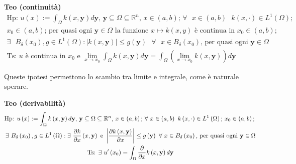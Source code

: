 \documentclass{article}
\begin{document}
\textbf{Teo (continuit\`{a})}%
\begin{gather*}
\text{Hp: }u\left( x\right) :=\int_{\Omega }k\left( x,\mathbf{y}\right) d%
\mathbf{y}\text{, }\mathbf{y}\subseteq \Omega \subseteq 
\mathbb{R}
^{n}\text{, }x\in \left( a,b\right) \text{; }\forall \text{ }x\in \left(
a,b\right) \text{ }k\left( x,\cdot \right) \in L^{1}\left( \Omega \right) 
\text{;} \\
x_{0}\in \left( a,b\right) \text{; per quasi ogni }\mathbf{y}\in \Omega 
\text{ la funzione }x\mapsto k\left( x,y\right) \text{ \`{e} continua in }%
x_{0}\in \left( a,b\right) \text{;} \\
\exists \text{ }B_{\delta }\left( x_{0}\right) ,g\in L^{1}\left( \Omega
\right) :\left\vert k\left( x,\mathbf{y}\right) \right\vert \leq g\left( 
\mathbf{y}\right) \text{ }\forall \text{ }x\in B_{\delta }\left(
x_{0}\right) \text{, per quasi ogni }\mathbf{y}\in \Omega \\
\text{Ts: }u\text{ \`{e} continua in }x_{0}\text{ e }\lim_{x\rightarrow
x_{0}}\int_{\Omega }k\left( x,\mathbf{y}\right) d\mathbf{y=}\int_{\Omega
}\left( \lim_{x\rightarrow x_{0}}k\left( x,\mathbf{y}\right) \right) d%
\mathbf{y}
\end{gather*}

Queste ipotesi permettono lo scambio tra limite e integrale, come \`{e}
naturale sperare.

\textbf{Teo (derivabilit\`{a})}%
\begin{gather*}
\text{Hp: }u\left( x\right) :=\int_{\Omega }k\left( x,\mathbf{y}\right) d%
\mathbf{y}\text{, }\mathbf{y}\subseteq \Omega \subseteq 
\mathbb{R}
^{n}\text{, }x\in \left( a,b\right) \text{; }\forall \text{ }x\in \left(
a,b\right) \text{ }k\left( x,\cdot \right) \in L^{1}\left( \Omega \right) 
\text{; }x_{0}\in \left( a,b\right) \text{; } \\
\exists \text{ }B_{\delta }\left( x_{0}\right) ,g\in L^{1}\left( \Omega
\right) :\exists \text{ }\frac{\partial k}{\partial x}\left( x,\mathbf{y}%
\right) \text{ e }\left\vert \frac{\partial k\left( x,\mathbf{y}\right) }{%
\partial x}\right\vert \leq g\left( \mathbf{y}\right) \text{ }\forall \text{ 
}x\in B_{\delta }\left( x_{0}\right) \text{, per quasi ogni }\mathbf{y}\in
\Omega \\
\text{Ts: }\exists \text{ }u^{\prime }\left( x_{0}\right) =\int_{\Omega }%
\frac{\partial }{\partial x}k\left( x,\mathbf{y}\right) d\mathbf{y}
\end{gather*}
\end{document}
